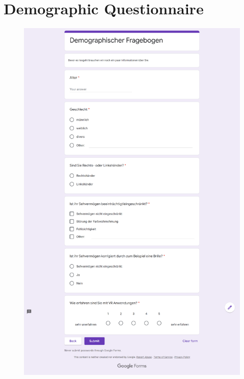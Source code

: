 \section{Demographic Questionnaire}
\begin{figure}[hbt!]
\centering
\includegraphics[width=\textwidth]{figures/Appendix/demographic questionair.png}
\end{figure}

